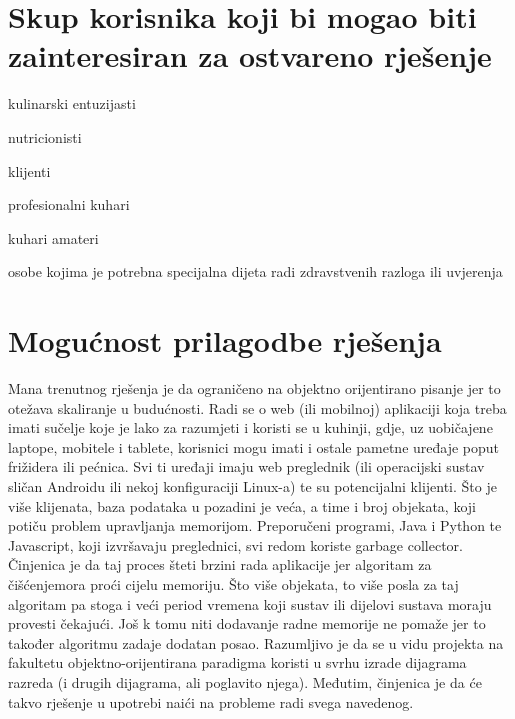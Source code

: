 	\section{Skup korisnika koji bi mogao biti zainteresiran za ostvareno rješenje}
	\begin{packed_item}
		\item kulinarski entuzijasti
		\item nutricionisti
		\item klijenti
		\item[]\begin{packed_item}
			\item profesionalni kuhari
			\item kuhari amateri
			\item osobe kojima je potrebna specijalna dijeta radi zdravstvenih razloga ili uvjerenja
		\end{packed_item}
	\end{packed_item}

	\section{Mogućnost prilagodbe rješenja}
	Mana trenutnog rješenja je da ograničeno na objektno orijentirano pisanje jer to otežava skaliranje u budućnosti. Radi se o web (ili mobilnoj) aplikaciji koja treba imati sučelje koje je lako za razumjeti i koristi se u kuhinji, gdje, uz uobičajene laptope, mobitele i tablete, korisnici mogu imati i ostale pametne uređaje poput frižidera ili pećnica. Svi ti uređaji imaju web preglednik (ili operacijski sustav sličan Androidu ili nekoj konfiguraciji Linux-a) te su potencijalni klijenti. Što je više klijenata, baza podataka u pozadini je veća, a time i broj objekata, koji potiču problem upravljanja memorijom. Preporučeni programi, Java i Python te Javascript, koji izvršavaju preglednici, svi redom koriste garbage collector. Činjenica je da taj proces šteti brzini rada aplikacije jer algoritam za \glqq čišćenje\grqq mora proći cijelu memoriju. Što više objekata, to više posla za taj algoritam pa stoga i veći period vremena koji sustav ili dijelovi sustava moraju provesti čekajući. Još k tomu niti dodavanje radne memorije ne pomaže jer to također algoritmu zadaje dodatan posao. Razumljivo je da se u vidu projekta na fakultetu objektno-orijentirana paradigma koristi u svrhu izrade dijagrama razreda (i drugih dijagrama, ali poglavito njega). Međutim, činjenica je da će takvo rješenje u upotrebi naići na probleme radi svega navedenog.

